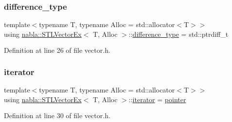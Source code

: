 \mbox{\label{classnabla_1_1_s_t_l_vector_ex_a17cbfc53d4b35559911b1ef501629da4}} 
\subsubsection{\texorpdfstring{difference\_type}{difference\_type}}
{\footnotesize\ttfamily template$<$typename T, typename Alloc = std\+::allocator$<$\+T$>$$>$ \\
using \mbox{\hyperlink{classnabla_1_1_s_t_l_vector_ex}{nabla\+::\+S\+T\+L\+Vector\+Ex}}$<$ T, Alloc $>$\+::\mbox{\hyperlink{classnabla_1_1_s_t_l_vector_ex_a17cbfc53d4b35559911b1ef501629da4}{difference\+\_\+type}} =  std\+::ptrdiff\+\_\+t}



Definition at line 26 of file vector.\+h.

\mbox{\label{classnabla_1_1_s_t_l_vector_ex_a4bd3bc9bbe369d76e958f3180c22f40b}} 
\subsubsection{\texorpdfstring{iterator}{iterator}}
{\footnotesize\ttfamily template$<$typename T, typename Alloc = std\+::allocator$<$\+T$>$$>$ \\
using \mbox{\hyperlink{classnabla_1_1_s_t_l_vector_ex}{nabla\+::\+S\+T\+L\+Vector\+Ex}}$<$ T, Alloc $>$\+::\mbox{\hyperlink{classnabla_1_1_s_t_l_vector_ex_a4bd3bc9bbe369d76e958f3180c22f40b}{iterator}} =  \mbox{\hyperlink{classnabla_1_1_s_t_l_vector_ex_a396f1267c3ea9874a98905cad4137af3}{pointer}}}



Definition at line 30 of file vector.\+h.

\mbox{\label{classnabla_1_1_s_t_l_vector_ex_a396f1267c3ea9874a98905cad4137af3}} 
